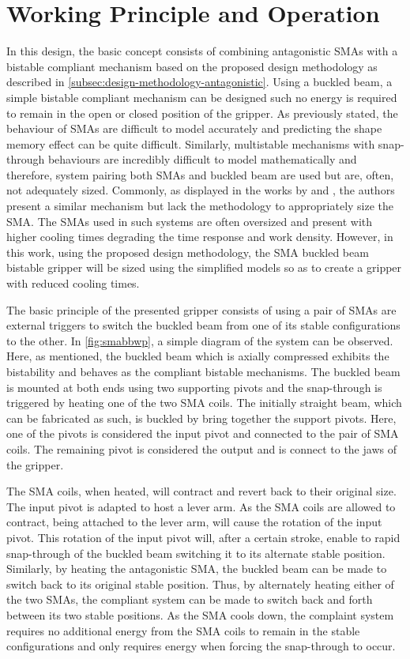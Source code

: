 \section{Working Principle and Operation}
In this design, the basic concept consists of combining antagonistic SMAs with a bistable compliant mechanism based on the proposed design methodology as described in \cref{subsec:design-methodology-antagonistic}. Using a buckled beam, a simple bistable compliant mechanism can be designed such no energy is required to remain in the open or closed position of the gripper. As previously stated, the behaviour of SMAs are difficult to model accurately and predicting the shape memory effect can be quite difficult. Similarly, multistable mechanisms with snap-through behaviours are incredibly difficult to model mathematically and therefore, system pairing both SMAs and buckled beam are used but are, often, not adequately sized. Commonly, as displayed in the works by \cite{scholtesDevelopmentBistableSMA2021} and \cite{welschVacuumGripperSystem2018}, the authors present a similar mechanism but lack the methodology to appropriately size the SMA. The SMAs used in such systems are often oversized and present with higher cooling times degrading the time response and work density. However, in this work, using the proposed design methodology, the SMA buckled beam bistable gripper will be sized using the simplified models so as to create a gripper with reduced cooling times.

The basic principle of the presented gripper consists of using a pair of SMAs are external triggers to switch the buckled beam from one of its stable configurations to the other. In \cref{fig:smabbwp}, a simple diagram of the system can be observed. Here, as mentioned, the buckled beam which is axially compressed exhibits the bistability and behaves as the compliant bistable mechanisms. The buckled beam is mounted at both ends using two supporting pivots and the snap-through is triggered by heating one of the two SMA coils. The initially straight beam, which can be fabricated as such, is buckled by bring together the support pivots. Here, one of the pivots is considered the input pivot and connected to the pair of SMA coils. The remaining pivot is considered the output and is connect to the jaws of the gripper.

The SMA coils, when heated, will contract and revert back to their original size. The input pivot is adapted to host a lever arm. As the SMA coils are allowed to contract, being attached to the lever arm, will cause the rotation of the input pivot. This rotation of the input pivot will, after a certain stroke, enable to rapid snap-through of the buckled beam switching it to its alternate stable position. Similarly, by heating the antagonistic SMA, the buckled beam can be made to switch back to its original stable position. Thus, by alternately heating either of the two SMAs, the compliant system can be made to switch back and forth between its two stable positions. As the SMA cools down, the complaint system requires no additional energy from the SMA coils to remain in the stable configurations and only requires energy when forcing the snap-through to occur.

